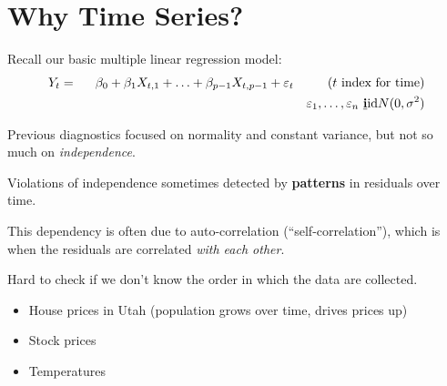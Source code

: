 \documentclass[12pt]{notes}
\begin{document}

\section{Why Time Series?}
Recall our basic multiple linear regression model:
\begin{eqnarray}
  Y_t & = & \beta_0 + \beta_1 X_{t,1} + \ldots + \beta_{p-1} X_{t,p-1} + \varepsilon_t  \mbox{ \hspace{2em}  ($t$ index for time)} \nonumber\\
  & & \mbox{ \hspace{17em}} \varepsilon_1, \ldots, \varepsilon_n \mbox{ {\bf \underline{i}}id} N(0,\sigma^2) \nonumber
\end{eqnarray}

Previous diagnostics focused on normality and constant variance, but not so much on \textit{independence}. 

\vspace{1em}
Violations of independence sometimes detected by \textbf{patterns} in residuals over time. 

\vspace{1em}
This dependency is often due to auto-correlation (``self-correlation''), which is when the residuals are correlated \textit{with each other}. 


\begin{minipage}[l][2cm][c]{\textwidth}
{\color{red}
Hard to check if we don't know the order in which the data are collected.
}
\end{minipage}


\begin{minipage}[l][3cm][c]{\textwidth}
{\color{red}
\begin{itemize}
\item House prices in Utah (population grows over time, drives prices up)
\item Stock prices
\item Temperatures
\end{itemize}
}
\end{minipage}
\end{document}
